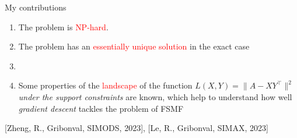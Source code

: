 \documentclass{beamer}
\begin{document}
     
 
 

\begin{frame}{My contributions}
		
		\begin{enumerate}
				\item The problem is   \textcolor{red}{NP-hard}.
		\vfill
		
		\item The problem has an  \textcolor{red}{essentially unique solution} in the exact case

\vfill

		
		\item {}
		
		\vfill
		\item Some properties of the \textcolor{red}{landscape} of the function $L(X,Y) = \|A - XY^\top\|^2$ \emph{under the support constraints} are known, which help to understand how well \emph{gradient descent} tackles the problem of FSMF
		
		
		
	\end{enumerate}
			
			\vspace{0.2cm}
		 \footnotesize{ \textcolor{mygreen}{[Zheng, R., Gribonval, SIMODS, 2023]}}, 
 \footnotesize{ \textcolor{mygreen}{[Le, R., Gribonval, SIMAX, 2023] }}
					
	
\end{frame}
\end{document}
